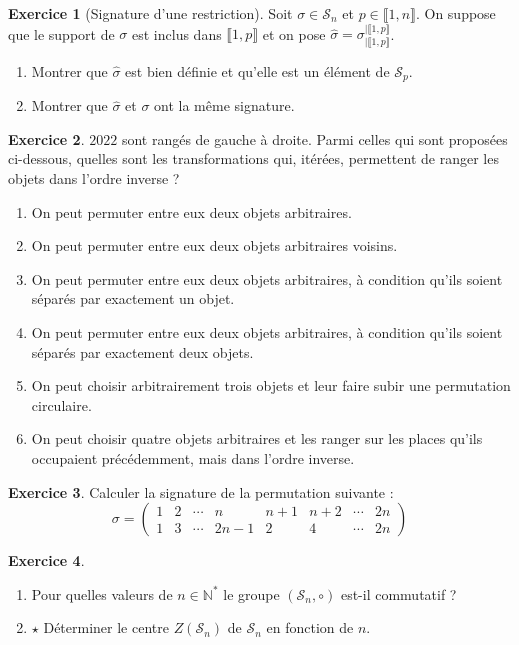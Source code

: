 \documentclass[french]{book}
\newcommand{\N}{\mathbb{N}}
\newcommand{\st}{^*}
\theoremstyle{definition}
\newtheorem{ex}{Exercice}[chapter]
\theoremstyle{theorem}
\theoremstyle{remark}
\begin{document}
\begin{ex}[Signature d'une restriction]
	Soit $\sigma\in\mathcal{S}_n$ et $p\in\llbracket1,n\rrbracket$. On suppose que le support de $\sigma$ est inclus dans $\llbracket 1,p\rrbracket$ et on pose $\hat\sigma=\displaystyle \sigma_{\mid\llbracket1,p\rrbracket}^{\mid\llbracket1,p\rrbracket}$.
	\begin{enumerate}
		\item Montrer que $\hat{\sigma}$ est bien définie et qu'elle est un élément de $\mathcal{S}_p$.
		\item Montrer que $\hat{\sigma}$ et $\sigma$ ont la même signature.
	\end{enumerate}
\end{ex}

\begin{ex}
	$2022$ sont rangés de gauche à droite. Parmi celles qui sont proposées ci-dessous, quelles sont les transformations qui, itérées, permettent de ranger les objets dans l'ordre inverse ?
	\begin{enumerate}[label=\roman*)]
		\item On peut permuter entre eux deux objets arbitraires.
		\item On peut permuter entre eux deux objets arbitraires voisins.
		\item On peut permuter entre eux deux objets arbitraires, à condition qu'ils soient séparés par exactement un objet.
		\item On peut permuter entre eux deux objets arbitraires, à condition qu'ils soient séparés par exactement deux objets.
		\item On peut choisir arbitrairement trois objets et leur faire subir une permutation circulaire.
		\item On peut choisir quatre objets arbitraires et les ranger sur les places qu'ils occupaient précédemment, mais dans l'ordre inverse.
	\end{enumerate}
\end{ex}

\begin{ex}
	Calculer la signature de la permutation suivante : $$\sigma=\begin{pmatrix}
		1&2&\cdots&n&n+1&n+2&\cdots&2n\\
		1&3&\cdots&2n-1&2&4&\cdots&2n
	\end{pmatrix}$$
\end{ex}

\begin{ex}
	\begin{enumerate}
		\item Pour quelles valeurs de $n\in\N\st$ le groupe $(\mathcal{S}_n,\circ)$ est-il commutatif ?
		\item $\star$ Déterminer le centre $Z(\mathcal{S}_n)$ de $\mathcal{S}_n$ en fonction de $n$.
	\end{enumerate}
\end{ex}
\end{document}

